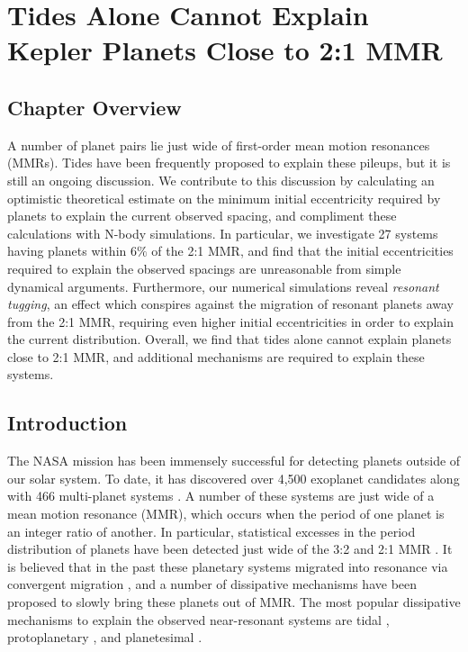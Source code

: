 \chapter[Tides Can't Explain Planets Close to MMR]{Tides Alone Cannot Explain Kepler Planets Close to 2:1 MMR}
\label{chap:Tides}

\section{Chapter Overview}

A number of \kep planet pairs lie just wide of first-order mean motion resonances (MMRs).
Tides have been frequently proposed to explain these pileups, but it is still an ongoing discussion.  
We contribute to this discussion by calculating an optimistic theoretical estimate on the minimum initial eccentricity required by \kep planets to explain the current observed spacing, and compliment these calculations with N-body simulations.
In particular, we investigate 27 \kep systems having planets within $6\%$ of the 2:1 MMR, and find that the initial eccentricities required to explain the observed spacings are unreasonable from simple dynamical arguments.
Furthermore, our numerical simulations reveal \textit{resonant tugging}, an effect which conspires against the migration of resonant planets away from the 2:1 MMR, requiring even higher initial eccentricities in order to explain the current \kep distribution. 
Overall, we find that tides alone cannot explain planets close to 2:1 MMR, and additional mechanisms are required to explain these systems. 

\section{Introduction}
\label{sec:introduction}
The NASA \kep{} mission has been immensely successful for detecting planets outside of our solar system.
To date, it has discovered over 4,500 exoplanet candidates along with 466 multi-planet systems \citep{Akeson2013,Rowe2014}. 
A number of these systems are just wide of a mean motion resonance (MMR), which occurs when the period of one planet is an integer ratio of another. 
In particular, statistical excesses in the period distribution of \kep{} planets have been detected just wide of the 3:2 and 2:1 MMR \citep[][]{Lissauer2011,Fabrycky2014,Steffen2015}.
It is believed that in the past these planetary systems migrated into resonance via convergent migration \citep{Lee2002}, and a number of dissipative mechanisms have been proposed to slowly bring these planets out of MMR.
The most popular dissipative mechanisms to explain the observed near-resonant systems are tidal \citep{LithwickWu2012, Batygin2013, Delisle2014},  protoplanetary \citep{Rein2012b, Baruteau2013, Goldreich2014}, and planetesimal \citep{Moore2013, Chatterjee2015}. 

